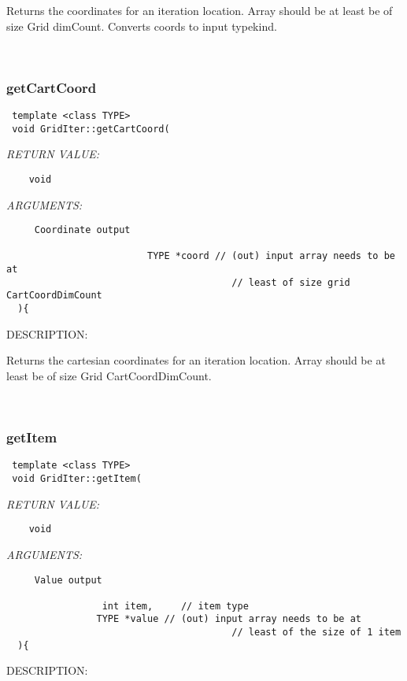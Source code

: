     Returns the coordinates for an iteration location. Array should be at least
   be of size Grid dimCount. Converts coords to input typekind.
   
 
\mbox{}\hrulefill\
 
\subsubsection [getCartCoord] {getCartCoord}


  
\begin{verbatim} template <class TYPE>
 void GridIter::getCartCoord(\end{verbatim}{\em RETURN VALUE:}
\begin{verbatim}    void\end{verbatim}{\em ARGUMENTS:}
\begin{verbatim}     Coordinate output 
   
                         TYPE *coord // (out) input array needs to be at
                                        // least of size grid CartCoordDimCount    
  ){\end{verbatim}
{\sf DESCRIPTION:\\ }


    Returns the cartesian coordinates for an iteration location. Array should be at least
   be of size Grid CartCoordDimCount.
   
 
\mbox{}\hrulefill\
 
\subsubsection [getItem] {getItem}


  
\begin{verbatim} template <class TYPE>
 void GridIter::getItem(\end{verbatim}{\em RETURN VALUE:}
\begin{verbatim}    void\end{verbatim}{\em ARGUMENTS:}
\begin{verbatim}     Value output 
   
                 int item,     // item type
                TYPE *value // (out) input array needs to be at
                                        // least of the size of 1 item    
  ){\end{verbatim}
{\sf DESCRIPTION:\\ }


